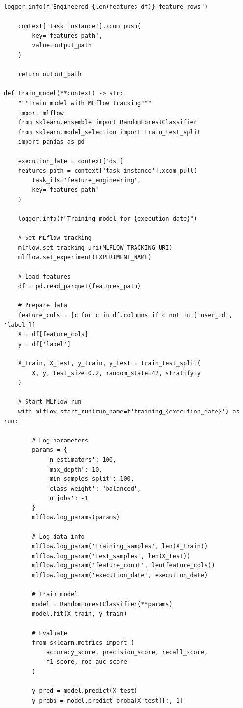 \begin{lstlisting}[style=python, caption=Production ML Training Pipeline with Airflow]
    logger.info(f"Engineered {len(features_df)} feature rows")

    context['task_instance'].xcom_push(
        key='features_path',
        value=output_path
    )

    return output_path

def train_model(**context) -> str:
    """Train model with MLflow tracking"""
    import mlflow
    from sklearn.ensemble import RandomForestClassifier
    from sklearn.model_selection import train_test_split
    import pandas as pd

    execution_date = context['ds']
    features_path = context['task_instance'].xcom_pull(
        task_ids='feature_engineering',
        key='features_path'
    )

    logger.info(f"Training model for {execution_date}")

    # Set MLflow tracking
    mlflow.set_tracking_uri(MLFLOW_TRACKING_URI)
    mlflow.set_experiment(EXPERIMENT_NAME)

    # Load features
    df = pd.read_parquet(features_path)

    # Prepare data
    feature_cols = [c for c in df.columns if c not in ['user_id', 'label']]
    X = df[feature_cols]
    y = df['label']

    X_train, X_test, y_train, y_test = train_test_split(
        X, y, test_size=0.2, random_state=42, stratify=y
    )

    # Start MLflow run
    with mlflow.start_run(run_name=f'training_{execution_date}') as run:

        # Log parameters
        params = {
            'n_estimators': 100,
            'max_depth': 10,
            'min_samples_split': 100,
            'class_weight': 'balanced',
            'n_jobs': -1
        }
        mlflow.log_params(params)

        # Log data info
        mlflow.log_param('training_samples', len(X_train))
        mlflow.log_param('test_samples', len(X_test))
        mlflow.log_param('feature_count', len(feature_cols))
        mlflow.log_param('execution_date', execution_date)

        # Train model
        model = RandomForestClassifier(**params)
        model.fit(X_train, y_train)

        # Evaluate
        from sklearn.metrics import (
            accuracy_score, precision_score, recall_score,
            f1_score, roc_auc_score
        )

        y_pred = model.predict(X_test)
        y_proba = model.predict_proba(X_test)[:, 1]


\end{lstlisting}
